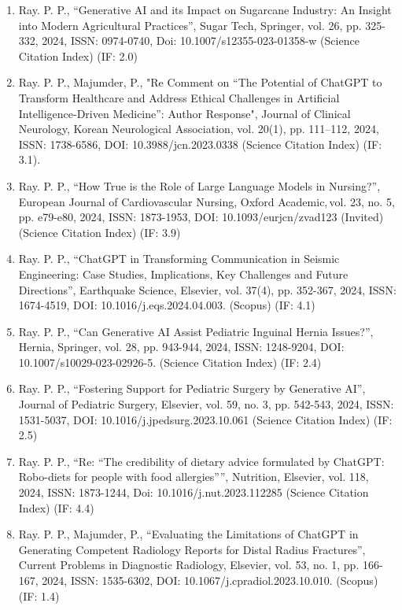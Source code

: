 \documentclass[11pt,a4paper]{moderncv}
\begin{document}
\begin{adjustwidth}{6em}{0pt}
\begin{enumerate}
		\item Ray. P. P., “Generative AI and its Impact on Sugarcane Industry: An Insight into Modern Agricultural Practices”, Sugar Tech, Springer, vol. 26, pp. 325-332, 2024, ISSN: 0974-0740, Doi: 10.1007/s12355-023-01358-w (Science Citation Index) (IF: 2.0)
		
		\item Ray. P. P., Majumder, P., "Re Comment on “The Potential of ChatGPT to Transform Healthcare and Address Ethical Challenges in Artificial Intelligence-Driven Medicine”: Author Response", Journal of Clinical Neurology, Korean Neurological Association, vol. 20(1), pp. 111–112, 2024, ISSN: 1738-6586, DOI: 10.3988/jcn.2023.0338 (Science Citation Index) (IF: 3.1). 
		
		\item Ray. P. P., “How True is the Role of Large Language Models in Nursing?”, European Journal of Cardiovascular Nursing, Oxford Academic, vol. 23, no. 5, pp. e79-e80, 2024, ISSN: 1873-1953, DOI: 10.1093/eurjcn/zvad123 (Invited) (Science Citation Index) (IF: 3.9)
		
		\item Ray. P. P., “ChatGPT in Transforming Communication in Seismic Engineering: Case Studies, Implications, Key Challenges and Future Directions”, Earthquake Science, Elsevier, vol. 37(4), pp. 352-367, 2024, ISSN: 1674-4519, DOI: 10.1016/j.eqs.2024.04.003. (Scopus) (IF: 4.1)
		
		\item Ray. P. P., “Can Generative AI Assist Pediatric Inguinal Hernia Issues?”, Hernia, Springer, vol. 28, pp. 943-944, 2024, ISSN: 1248-9204, DOI: 10.1007/s10029-023-02926-5. (Science Citation Index) (IF: 2.4)
		
		\item Ray. P. P., “Fostering Support for Pediatric Surgery by Generative AI”, Journal of Pediatric Surgery, Elsevier, vol. 59, no. 3, pp. 542-543, 2024, ISSN: 1531-5037, DOI: 10.1016/j.jpedsurg.2023.10.061 (Science Citation Index) (IF: 2.5)
		
		\item Ray. P. P., “Re: “The credibility of dietary advice formulated by ChatGPT: Robo-diets for people with food allergies””, Nutrition, Elsevier, vol. 118, 2024, ISSN: 1873-1244, Doi: 10.1016/j.nut.2023.112285 (Science Citation Index) (IF: 4.4)
		
		\item Ray. P. P., Majumder, P., “Evaluating the Limitations of ChatGPT in Generating Competent Radiology Reports for Distal Radius Fractures”, Current Problems in Diagnostic Radiology, Elsevier, vol. 53, no. 1, pp. 166-167, 2024, ISSN: 1535-6302, DOI: 10.1067/j.cpradiol.2023.10.010. (Scopus) (IF: 1.4)
		

\end{enumerate}
\end{adjustwidth}
\end{document}
